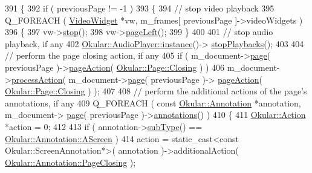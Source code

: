 \begin{DoxyCode}
391 \{
392     \textcolor{keywordflow}{if} ( previousPage != -1 )
393     \{
394         \textcolor{comment}{// stop video playback}
395         Q\_FOREACH ( \hyperlink{classVideoWidget}{VideoWidget} *vw, m\_frames[ previousPage ]->videoWidgets )
396         \{
397             vw->\hyperlink{classVideoWidget_a71bd6da5120ab3556d0ac41e905f6e26}{stop}();
398             vw->\hyperlink{classVideoWidget_a332a8907b98df63648b90f6ae6d42cac}{pageLeft}();
399         \}
400 
401         \textcolor{comment}{// stop audio playback, if any}
402         \hyperlink{classOkular_1_1AudioPlayer_a5bbc067e81b46451098a2a0becf23e67}{Okular::AudioPlayer::instance}()->
      \hyperlink{classOkular_1_1AudioPlayer_a48730f5eb7dbc0551679c367e0ba9234}{stopPlaybacks}();
403 
404         \textcolor{comment}{// perform the page closing action, if any}
405         \textcolor{keywordflow}{if} ( m\_document->\hyperlink{classOkular_1_1Document_a1c95c2f192d739c217d00971da48f69d}{page}( previousPage )->\hyperlink{classOkular_1_1Page_a960c4dd29f12aaabaa66880c19540203}{pageAction}( 
      \hyperlink{classOkular_1_1Page_a6a8e241cdb604d5c90d5f80b169788f7ae9b42d3ddb97cc7f889104c73c686f80}{Okular::Page::Closing} ) )
406             m\_document->\hyperlink{classOkular_1_1Document_aabdf41f40fe0391590391e303891b5ed}{processAction}( m\_document->\hyperlink{classOkular_1_1Document_a1c95c2f192d739c217d00971da48f69d}{page}( previousPage )->
      \hyperlink{classOkular_1_1Page_a960c4dd29f12aaabaa66880c19540203}{pageAction}( \hyperlink{classOkular_1_1Page_a6a8e241cdb604d5c90d5f80b169788f7ae9b42d3ddb97cc7f889104c73c686f80}{Okular::Page::Closing} ) );
407 
408         \textcolor{comment}{// perform the additional actions of the page's annotations, if any}
409         Q\_FOREACH ( \textcolor{keyword}{const} \hyperlink{classOkular_1_1Annotation}{Okular::Annotation} *annotation, m\_document->
      \hyperlink{classOkular_1_1Document_a1c95c2f192d739c217d00971da48f69d}{page}( previousPage )->\hyperlink{classOkular_1_1Page_ad82e0f26d5435b5ccfa3d23c359ac23c}{annotations}() )
410         \{
411             \hyperlink{classOkular_1_1Action}{Okular::Action} *action = 0;
412 
413             \textcolor{keywordflow}{if} ( annotation->\hyperlink{classOkular_1_1Annotation_af9833449767eacd740f377e69a1fdd48}{subType}() == \hyperlink{classOkular_1_1Annotation_af71b46e37d5f850b97d5c4de3be9aac0a7cf8ba374ec139a8e2fb47a36182fa32}{Okular::Annotation::AScreen} )
414                 action = static\_cast<const Okular::ScreenAnnotation*>( annotation )->additionalAction( 
      \hyperlink{classOkular_1_1Annotation_aa34152e337b1cb13e9327f37fc295057a163dda71b8c9ac45ce1c250f37458bac}{Okular::Annotation::PageClosing} );

\end{DoxyCode}
